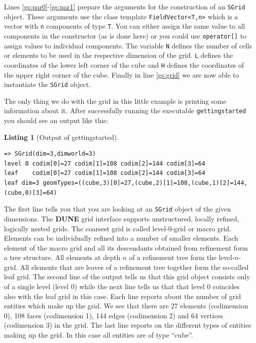 \documentclass[11pt,a4paper,headinclude,footinclude,DIV16,normalheadings]{scrreprt}
\newcommand{\Dune}{{\sf\bfseries DUNE}\xspace}
\newtheorem{lst}{Listing}
\begin{document}
Lines \ref{gs:par0}-\ref{gs:par1} prepare the arguments for the
construction of an \lstinline!SGrid! object. These arguments use the
class template \lstinline!FieldVector<T,n>! which is a vector with
\lstinline!n!  components of type \lstinline!T!. You can either assign
the same value to all components in the constructor (as is done here)
or you could use \lstinline!operator[]! to assign values to individual
components.  The variable \lstinline!N! defines the number of cells or
elements to be used in the respective dimension of the grid.
\lstinline!L! defines the coordinates of the lower left corner of the
cube and \lstinline!H!  defines the coordinates of the upper right corner of the cube.
Finally in line \ref{gs:grid} we are now able to
instantiate the \lstinline!SGrid!  object.

The only thing we do with the grid in this little example is printing
some information about it. After successfully running the executable
\lstinline!gettingstarted! you should see an output like this:

\begin{lst}[Output of gettingstarted] \mbox{}

\begin{lstlisting}[basicstyle=\ttfamily\scriptsize]
=> SGrid(dim=3,dimworld=3)
level 0 codim[0]=27 codim[1]=108 codim[2]=144 codim[3]=64
leaf    codim[0]=27 codim[1]=108 codim[2]=144 codim[3]=64
leaf dim=3 geomTypes=((cube,3)[0]=27,(cube,2)[1]=108,(cube,1)[2]=144,(cube,0)[3]=64)
\end{lstlisting}
\end{lst}

The first line tells you that you are looking at an \lstinline!SGrid!
object of the given dimensions. The \Dune{} grid interface supports
unstructured, locally refined, logically nested grids. The coarsest
grid is called level-0-grid or macro grid. Elements can be
individually refined into a number of smaller elements. Each element
of the macro grid and all its descendants obtained from refinement
form a tree structure. All elements at depth $n$ of a refinement tree
form the level-$n$-grid. All elements that are leaves of a refinement
tree together form the so-called leaf grid. The second line of the
output tells us that this grid object consists only of a single level
(level $0$) while the next line tells us that that level 0 coincides
also with the leaf grid in this case. Each line reports about the
number of grid entities which make up the grid. We see that there are
27 elements (codimension 0), 108 faces (codimension 1), 144 edges
(codimension 2) and 64 vertices (codimension 3) in the grid. The last
line reports on the different types of entities making up the grid. In
this case all entities are of type ``cube''.
\end{document}
